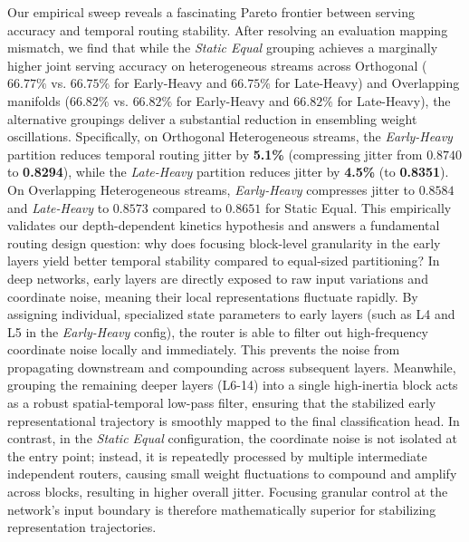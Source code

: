Our empirical sweep reveals a fascinating Pareto frontier between serving accuracy and temporal routing stability. After resolving an evaluation mapping mismatch, we find that while the \emph{Static Equal} grouping achieves a marginally higher joint serving accuracy on heterogeneous streams across Orthogonal ($66.77\%$ vs. $66.75\%$ for Early-Heavy and $66.75\%$ for Late-Heavy) and Overlapping manifolds ($66.82\%$ vs. $66.82\%$ for Early-Heavy and $66.82\%$ for Late-Heavy), the alternative groupings deliver a substantial reduction in ensembling weight oscillations. Specifically, on Orthogonal Heterogeneous streams, the \emph{Early-Heavy} partition reduces temporal routing jitter by \textbf{5.1\%} (compressing jitter from $0.8740$ to \textbf{0.8294}), while the \emph{Late-Heavy} partition reduces jitter by \textbf{4.5\%} (to \textbf{0.8351}). On Overlapping Heterogeneous streams, \emph{Early-Heavy} compresses jitter to $0.8584$ and \emph{Late-Heavy} to $0.8573$ compared to $0.8651$ for Static Equal. This empirically validates our depth-dependent kinetics hypothesis and answers a fundamental routing design question: why does focusing block-level granularity in the early layers yield better temporal stability compared to equal-sized partitioning? In deep networks, early layers are directly exposed to raw input variations and coordinate noise, meaning their local representations fluctuate rapidly. By assigning individual, specialized state parameters to early layers (such as L4 and L5 in the \emph{Early-Heavy} config), the router is able to filter out high-frequency coordinate noise locally and immediately. This prevents the noise from propagating downstream and compounding across subsequent layers. Meanwhile, grouping the remaining deeper layers (L6-14) into a single high-inertia block acts as a robust spatial-temporal low-pass filter, ensuring that the stabilized early representational trajectory is smoothly mapped to the final classification head. In contrast, in the \emph{Static Equal} configuration, the coordinate noise is not isolated at the entry point; instead, it is repeatedly processed by multiple intermediate independent routers, causing small weight fluctuations to compound and amplify across blocks, resulting in higher overall jitter. Focusing granular control at the network's input boundary is therefore mathematically superior for stabilizing representation trajectories.

